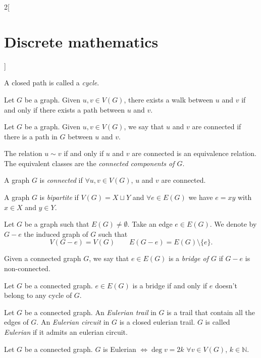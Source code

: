 \documentclass[../../../main.tex]{subfiles}
\begin{document}
\begin{multicols}{2}[\section{Discrete mathematics}]
\begin{definition}
A closed path is called a \textit{cycle}.
\end{definition}
\begin{prop}
Let $G$ be a graph. Given $u,v\in V(G)$, there exists a walk between $u$ and $v$ if and only if there exists a path between $u$ and $v$.
\end{prop}
\begin{definition}
Let $G$ be a graph. Given $u,v\in V(G)$, we say that $u$ and $v$ are connected if there is a path in $G$ between $u$ and $v$.
\end{definition}
\begin{prop}
The relation $u\sim v$ if and only if $u$ and $v$ are connected is an equivalence relation. The equivalent classes are the \textit{connected components of $G$}.
\end{prop}
\begin{definition}
A graph $G$ is \textit{connected} if $\forall u,v\in V(G)$, $u$ and $v$ are connected.
\end{definition}
\begin{definition}
A graph $G$ is \textit{bipartite} if $V(G)=X\sqcup Y$ and $\forall e\in E(G)$ we have $e=xy$ with $x\in X$ and $y\in Y$.
\end{definition}
\begin{definition}
Let $G$ be a graph such that $E(G)\ne\emptyset$. Take an edge $e\in E(G)$. We denote by $G-e$ the induced graph of $G$ such that $$V(G-e)=V(G)\qquad E(G-e)=E(G)\setminus\{e\}.$$
\end{definition}
\begin{definition}
Given a connected graph $G$, we say that $e\in E(G)$ is a \textit{bridge of $G$} if $G-e$ is non-connected.
\end{definition}
\begin{prop}
Let $G$ be a connected graph. $e\in E(G)$ is a bridge if and only if $e$ doesn't belong to any cycle of $G$.
\end{prop}
\begin{definition}
Let $G$ be a connected graph. An \textit{Eulerian trail} in $G$ is a trail that contain all the edges of $G$. An \textit{Eulerian circuit} in $G$ is a closed eulerian trail. $G$ is called \textit{Eulerian} if it admits an eulerian circuit.
\end{definition}
\begin{theorem}
Let $G$ be a connected graph. $G$ is Eulerian $\iff\deg v=2k$ $\forall v\in V(G)$, $k\in\mathbb{N}$.
\end{theorem}

\end{multicols}
\end{document}
